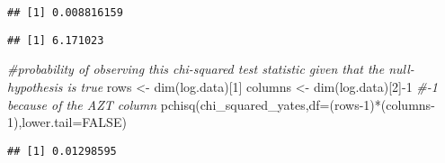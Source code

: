 \documentclass[
]{article}
\newenvironment{Shaded}{\begin{snugshade}}{\end{snugshade}}
\newcommand{\AttributeTok}[1]{\textcolor[rgb]{0.77,0.63,0.00}{#1}}
\newcommand{\CommentTok}[1]{\textcolor[rgb]{0.56,0.35,0.01}{\textit{#1}}}
\newcommand{\ConstantTok}[1]{\textcolor[rgb]{0.00,0.00,0.00}{#1}}
\newcommand{\DecValTok}[1]{\textcolor[rgb]{0.00,0.00,0.81}{#1}}
\newcommand{\FloatTok}[1]{\textcolor[rgb]{0.00,0.00,0.81}{#1}}
\newcommand{\FunctionTok}[1]{\textcolor[rgb]{0.00,0.00,0.00}{#1}}
\newcommand{\NormalTok}[1]{#1}
\newcommand{\OtherTok}[1]{\textcolor[rgb]{0.56,0.35,0.01}{#1}}
\newcommand{\SpecialCharTok}[1]{\textcolor[rgb]{0.00,0.00,0.00}{#1}}
\begin{document}
\begin{verbatim}
## [1] 0.008816159
\end{verbatim}

\begin{Shaded}
\end{Shaded}

\begin{verbatim}
## [1] 6.171023
\end{verbatim}

\begin{Shaded}
\begin{Highlighting}[]
\CommentTok{\#probability of observing this chi{-}squared test statistic given that the null{-}hypothesis is true}
\NormalTok{rows }\OtherTok{\textless{}{-}} \FunctionTok{dim}\NormalTok{(log.data)[}\DecValTok{1}\NormalTok{]}
\NormalTok{columns }\OtherTok{\textless{}{-}} \FunctionTok{dim}\NormalTok{(log.data)[}\DecValTok{2}\NormalTok{]}\SpecialCharTok{{-}}\DecValTok{1} \CommentTok{\#{-}1 because of the AZT column}
\FunctionTok{pchisq}\NormalTok{(chi\_squared\_yates,}\AttributeTok{df=}\NormalTok{(rows}\DecValTok{{-}1}\NormalTok{)}\SpecialCharTok{*}\NormalTok{(columns}\DecValTok{{-}1}\NormalTok{),}\AttributeTok{lower.tail=}\ConstantTok{FALSE}\NormalTok{)}
\end{Highlighting}
\end{Shaded}

\begin{verbatim}
## [1] 0.01298595
\end{verbatim}

\begin{Shaded}
\end{Shaded}
\end{document}
